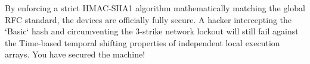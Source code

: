 \begin{takeawaybox}
By enforcing a strict HMAC-SHA1 algorithm mathematically matching the global RFC standard, the devices are officially fully secure. A hacker intercepting the `Basic` hash and circumventing the 3-strike network lockout will still fail against the Time-based temporal shifting properties of independent local execution arrays. You have secured the machine!
\end{takeawaybox}
